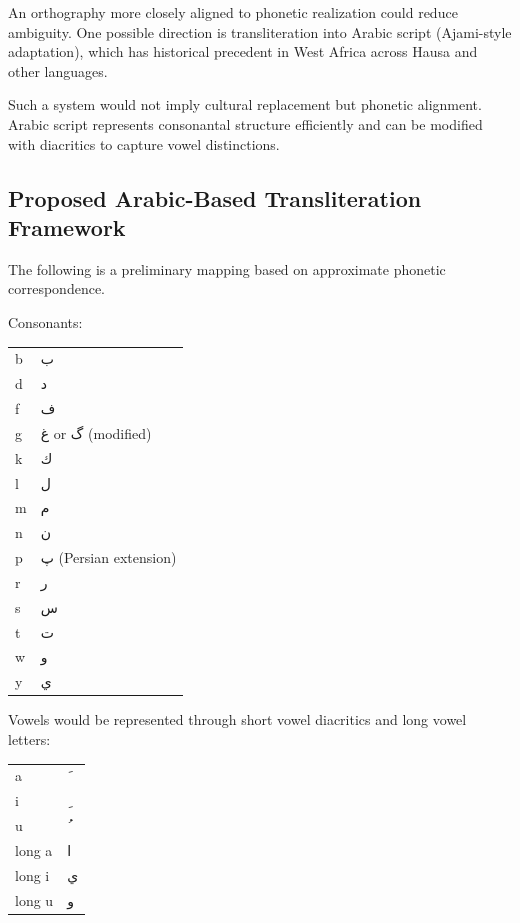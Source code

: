 \documentclass[12pt]{article}
\begin{document}
An orthography more closely aligned to phonetic realization could reduce ambiguity. One possible direction is transliteration into Arabic script (Ajami-style adaptation), which has historical precedent in West Africa across Hausa and other languages.

Such a system would not imply cultural replacement but phonetic alignment. Arabic script represents consonantal structure efficiently and can be modified with diacritics to capture vowel distinctions.

\subsection{Proposed Arabic-Based Transliteration Framework}

The following is a preliminary mapping based on approximate phonetic correspondence.

Consonants:

\begin{center}
\begin{tabular}{ll}
b & ب \\
d & د \\
f & ف \\
g & غ or گ (modified) \\
k & ك \\
l & ل \\
m & م \\
n & ن \\
p & پ (Persian extension) \\
r & ر \\
s & س \\
t & ت \\
w & و \\
y & ي \\
\end{tabular}
\end{center}

Vowels would be represented through short vowel diacritics and long vowel letters:

\begin{center}
\begin{tabular}{ll}
a & َ \\
i & ِ \\
u & ُ \\
long a & ا \\
long i & ي \\
long u & و \\
\end{tabular}
\end{center}
\end{document}
